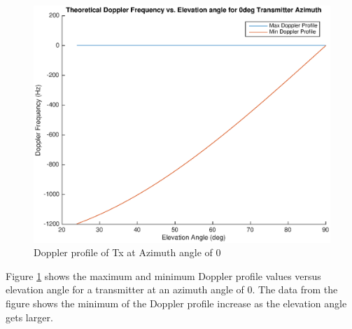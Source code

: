 \begin{figure}
	\begin{center}
		\includegraphics[width=15cm]{images/background/3d_geometry_tx_0az_doppler_profile.eps}
		\caption{Doppler profile of Tx at Azimuth angle of 0\textdegree}
		\label{fig:3D_model_0az_doppler}
	\end{center}
\end{figure}

Figure \ref{fig:3D_model_0az_doppler} shows the maximum and minimum Doppler profile values versus elevation angle for a transmitter at an azimuth angle of 0\textdegree. The data from the figure shows the minimum of the Doppler profile increase as the elevation angle gets larger.
